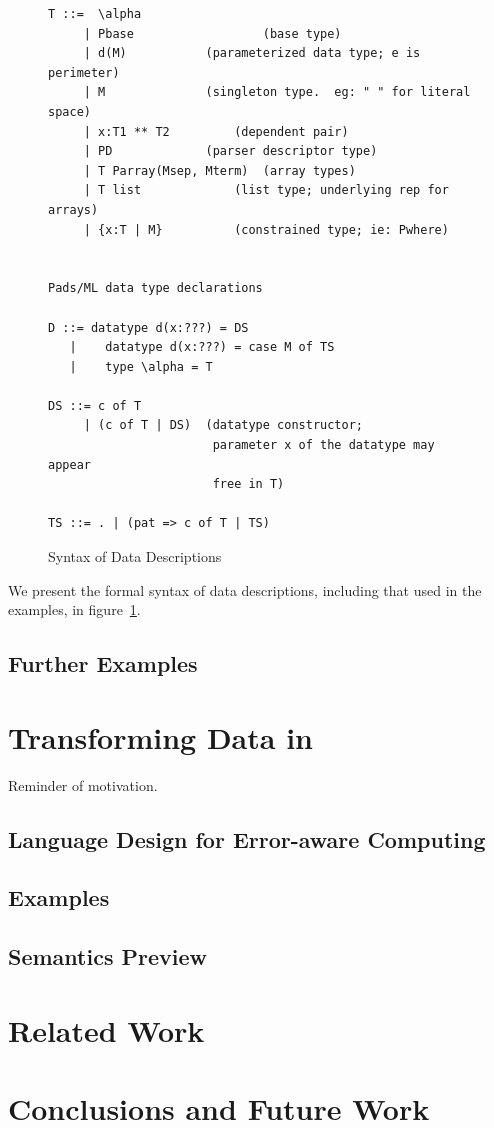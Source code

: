 \documentclass{entcs}
\begin{document}
\begin{figure}
  \centering
\begin{verbatim}
T ::=  \alpha
     | Pbase                  (base type)
     | d(M)		      (parameterized data type; e is perimeter)
     | M		      (singleton type.  eg: " " for literal space)
     | x:T1 ** T2	      (dependent pair)
     | PD		      (parser descriptor type)
     | T Parray(Msep, Mterm)  (array types)
     | T list		      (list type; underlying rep for arrays)
     | {x:T | M}	      (constrained type; ie: Pwhere)


Pads/ML data type declarations

D ::= datatype d(x:???) = DS
   |    datatype d(x:???) = case M of TS
   |    type \alpha = T

DS ::= c of T
     | (c of T | DS)  (datatype constructor; 
                       parameter x of the datatype may appear
                       free in T)

TS ::= . | (pat => c of T | TS)
\end{verbatim}
  \caption{Syntax of Data Descriptions}
  \label{fig:syntax-dd}
\end{figure}

We present the formal syntax of data descriptions, including that used
in the examples, in figure~\ref{fig:syntax-dd}.

\subsection{Further Examples}

\section{Transforming Data in \datatype{}}
\label{sec:data-transformation}

Reminder of motivation.



\subsection{Language Design for Error-aware Computing}

\subsection{Examples}

\subsection{Semantics Preview}



\section{Related Work}
\label{sec:related-work}

\section{Conclusions and Future Work}
\label{sec:conclusion}
\end{document}
